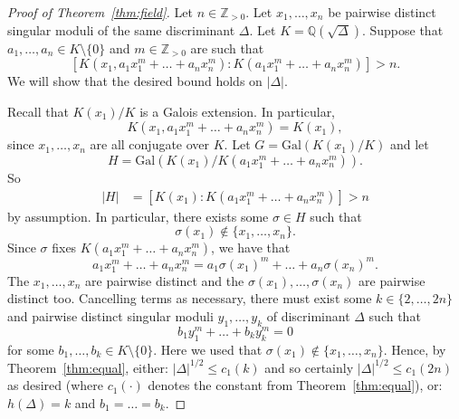 \documentclass[11pt,a4paper, british]{amsart}
\theoremstyle{definition}
\theoremstyle{remark}
\numberwithin{equation}{section}
\newcommand{\Q}{\mathbb{Q}} %
\newcommand{\Z}{\mathbb{Z}} %
\newcommand{\Gal}{\mathrm{Gal}} %
\begin{document}
\begin{proof}[Proof of Theorem~\ref{thm:field}]
	Let $n \in \Z_{>0}$. Let $x_1, \ldots, x_n$ be pairwise distinct singular moduli of the same discriminant $\Delta$. Let $K = \Q(\sqrt{\Delta})$.	Suppose that $a_1, \ldots, a_n \in K \setminus \{0\}$  and $m \in \Z_{>0}$ are such that
	\[\left[K\left(x_1, a_1 x_1^m + \ldots + a_n x_n^m\right) : K\left(a_1 x_1^m + \ldots + a_n x_n^m\right) \right] > n.\]
	We will show that the desired bound holds on $\lvert \Delta \rvert$.
	
	Recall that $K(x_1) / K$ is a Galois extension. In particular, 
	\[  K(x_1, a_1 x_1^m + \ldots + a_n x_n^m) = K(x_1),\] 
	since $x_1, \ldots, x_n$ are all conjugate over $K$. Let $G = \Gal(K(x_1) / K)$ and let 
\[H = \Gal\left(K\left(x_1\right)/ K\left(a_1 x_1^m + \ldots + a_n x_n^m\right)\right).\] So
	\begin{align*}
		 \lvert H \rvert &= \left[K\left(x_1\right) : K\left(a_1 x_1^m + \ldots + a_n x_n^m\right) \right] > n
		 \end{align*}
	 by assumption. In particular, there exists some $\sigma \in H$ such that 
	 \[\sigma(x_1) \notin \{x_1, \ldots, x_n\}.\]
	 Since $\sigma$ fixes $K(a_1 x_1^m + \ldots + a_n x_n^m)$, we have that
	 \[ a_1 x_1^m + \ldots + a_n x_n^m = a_1 \sigma(x_1)^m + \ldots + a_n \sigma(x_n)^m.\]
	 The $x_1, \ldots, x_n$ are pairwise distinct and the $\sigma(x_1), \ldots, \sigma(x_n)$ are pairwise distinct too. Cancelling terms as necessary, there must exist some $k \in \{2, \ldots, 2n\}$ and pairwise distinct singular moduli $y_1, \ldots, y_k$ of discriminant $\Delta$ such that
	 \[ b_1 y_1^m + \ldots + b_k y_k^m = 0\]
	 for some $b_1, \ldots, b_k \in K \setminus \{0\}$. Here we used that $\sigma(x_1) \notin \{x_1, \ldots, x_n\}$. Hence, by Theorem~\ref{thm:equal}, either: $\lvert \Delta \rvert^{1/2} \leq c_1(k)$ and so certainly $\lvert \Delta \rvert^{1/2} \leq c_1(2n)$ as desired (where $c_1(\cdot)$ denotes the constant from Theorem~\ref{thm:equal}), or: $h(\Delta) = k$ and $b_1 = \ldots = b_k$. 
	 

\end{proof}
\end{document}
